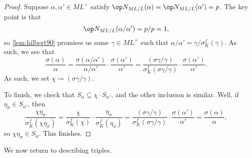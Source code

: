 \begin{proof}
	Suppose $\alpha,\alpha'\in ML^\times$ satisfy $\op N_{ML/L}(\alpha)=\op N_{ML/L}(\alpha')=p$. The key point is that
	\[\op N_{ML/L}(\alpha/\alpha')=p/p=1,\]
	so \autoref{lem:hilbert90} promises us some $\gamma\in ML^\times$ such that $\alpha/\alpha'=\gamma/\sigma_K^f(\gamma)$. As such, we see that
	\[\frac{\sigma(\alpha)}{\alpha}=\frac{\sigma(\alpha/\alpha')}{\alpha/\alpha'}\cdot\frac{\sigma(\alpha')}{\alpha'}=\frac{(\sigma\gamma/\gamma)}{\sigma_K^f(\sigma\gamma/\gamma)}\cdot\frac{\sigma(\alpha')}{\alpha'}.\]
	As such, we set $\chi\coloneqq(\sigma\gamma/\gamma)$.
	
	To finish, we check that $S_\alpha\subseteq \chi\cdot S_{\alpha'}$, and the other inclusion is similar. Well, if $\eta_\sigma\in S_{\alpha'}$, then
	\[\frac{\chi \eta_\sigma}{\sigma_K^f(\chi \eta_\sigma)}=\frac \chi {\sigma_K^f(\chi )}\cdot\frac{\eta_\sigma}{\sigma_K^f(\eta_\sigma)}=\frac{(\sigma\gamma/\gamma)}{\sigma_K^f(\sigma\gamma/\gamma)}\cdot\frac{\sigma(\alpha')}{\alpha'}=\frac{\sigma(\alpha)}\alpha,\]
	so $\chi \eta_\sigma\in S_\alpha$. This finishes.
\end{proof}
We now return to describing triples.
